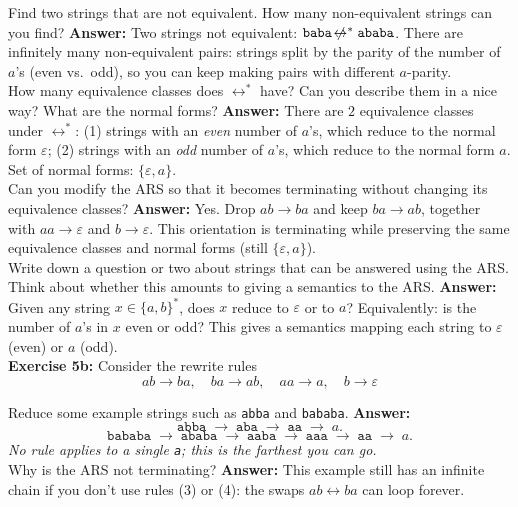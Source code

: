 \documentclass{article}
\theoremstyle{theorem}
\theoremstyle{definition}
\theoremstyle{remark}
\begin{document}
Find two strings that are not equivalent. How many non-equivalent strings can you find?  
\textbf{Answer:} Two strings not equivalent: \(\texttt{baba} \not\!\leftrightarrow^{*} \texttt{ababa}\). There are infinitely many non-equivalent pairs: strings split by the parity of the number of \(a\)'s (even vs.\ odd), so you can keep making pairs with different \(a\)-parity.\\[1em]

How many equivalence classes does \(\leftrightarrow^{*}\) have? Can you describe them in a nice way? What are the normal forms?  
\textbf{Answer:} There are \(2\) equivalence classes under \(\leftrightarrow^{*}\):
(1) strings with an \emph{even} number of \(a\)'s, which reduce to the normal form \(\varepsilon\);
(2) strings with an \emph{odd} number of \(a\)'s, which reduce to the normal form \(a\).
Set of normal forms: \(\{\varepsilon, a\}\).\\[1em]

Can you modify the ARS so that it becomes terminating without changing its equivalence classes?  
\textbf{Answer:} Yes. Drop \(ab \to ba\) and keep \(ba \to ab\), together with \(aa \to \varepsilon\) and \(b \to \varepsilon\).
This orientation is terminating while preserving the same equivalence classes and normal forms (still \(\{\varepsilon, a\}\)).\\[1em]

Write down a question or two about strings that can be answered using the ARS. Think about whether this amounts to giving a semantics to the ARS.  
\textbf{Answer:} Given any string \(x \in \{a,b\}^{*}\), does \(x\) reduce to \(\varepsilon\) or to \(a\)?
Equivalently: is the number of \(a\)'s in \(x\) even or odd? This gives a semantics mapping each string to \(\varepsilon\) (even) or \(a\) (odd).\\[1em]

\textbf{Exercise 5b:} Consider the rewrite rules
\[
ab \to ba, \quad ba \to ab, \quad aa \to a, \quad b \to \varepsilon
\]

Reduce some example strings such as \texttt{abba} and \texttt{bababa}.  
\textbf{Answer:}
\[
\texttt{abba} \;\to\; \texttt{aba} \;\to\; \texttt{aa} \;\to\; a.
\]
\[
\texttt{bababa} \;\to\; \texttt{ababa} \;\to\; \texttt{aaba} \;\to\; \texttt{aaa} \;\to\; \texttt{aa} \;\to\; a.
\]
\emph{No rule applies to a single \texttt{a}; this is the farthest you can go.}\\[1em]

Why is the ARS not terminating?  
\textbf{Answer:} This example still has an infinite chain if you don’t use rules (3) or (4): the swaps \(ab \leftrightarrow ba\) can loop forever.\\[1em]
\end{document}
